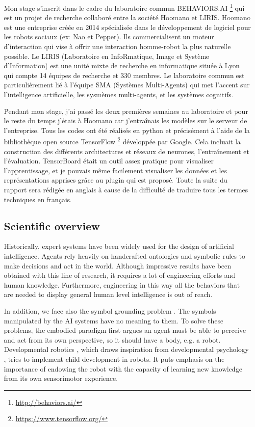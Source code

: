 Mon stage s'inscrit dans le cadre du laboratoire commun BEHAVIORS.AI%
\footnote{\href{http://behaviors.ai/}{http://behaviors.ai/}}
qui est un projet de recherche collaboré entre la société Hoomano et LIRIS.
Hoomano est une entreprise créée en 2014 spécialisée dans le développement
de logiciel pour les robots sociaux (ex: Nao et Pepper).
Ils commercialisent un moteur d'interaction qui
vise à offrir une interaction homme-robot la plus naturelle possible.
Le LIRIS (Laboratoire en InfoRmatique, Image et Système d'Information)
est une unité mixte de recherche en informatique située à Lyon qui compte
14 équipes de recherche et 330 membres. Le laboratoire commun est
particulièrement lié à l'équipe SMA (Systèmes Multi-Agents) qui
met l'accent sur l'intelligence artificielle, les sysmèmes multi-agents,
et les systèmes cognitifs.

Pendant mon stage, j'ai passé les deux premières semaines au
laboratoire et pour le reste du temps j'étais à Hoomano car j'entraînais
les modèles sur le serveur de l'entreprise. Tous les codes ont été
réalisés en python et précisément à l'aide de la bibliothèque open source
TensorFlow%
\footnote{\href{https://www.tensorflow.org/}{https://www.tensorflow.org/}}
développée par Google. Cela incluait la construction des
différents architectures et réseaux de neurones, l'entraînement et
l'évaluation.
TensorBoard était un outil assez pratique pour visualiser l'apprentissage,
et je pouvais même facilement visualiser les données et les
représentations apprises grâce au plugin qui est proposé.
Toute la suite du rapport sera rédigée en anglais à cause de la difficulté
de traduire tous les termes techniques en français.

\subsection{Scientific overview}

Historically, expert systems have been widely used for the design
of artificial intelligence. 
Agents rely heavily on handcrafted ontologies and symbolic rules to
make decisions and act in the world.
Although impressive results have been obtained with this line of
research, it requires a lot of engineering efforts and human knowledge.
Furthermore, engineering in this way all the behaviors that are needed
to display general human level intelligence is out of reach.

In addition, we face also the symbol grounding problem
\cite{S. Harnad 1990}. The symbols manipulated by the AI systems have
no meaning to them. To solve these problems, the embodied paradigm
\cite{A. Clark 1997} first argues an agent must be able to perceive and
act from its own perspective, so it should have a body, e.g. a robot.
Developmental robotics \cite{J. Weng 2001}, which draws inspiration
from developmental psychology \cite{J. Piaget 1952}, tries to implement
child development  in robots. It puts emphasis on the
importance of endowing the robot with the capacity of learning new
knowledge from its own sensorimotor experience.

